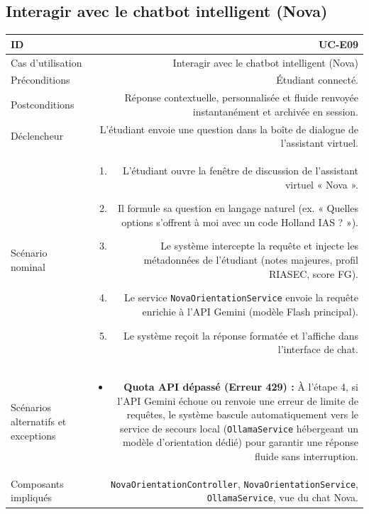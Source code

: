 \vspace{1.5em}

\subsection{Interagir avec le chatbot intelligent (Nova)}

\noindent
{}
\begin{tabularx}{\linewidth}{|L|R|}
\hline
{}ID & UC-E09 \\
\hline
Cas d'utilisation & Interagir avec le chatbot intelligent (Nova) \\
\hline
{}Préconditions & Étudiant connecté. \\
\hline
Postconditions & Réponse contextuelle, personnalisée et fluide renvoyée instantanément et archivée en session. \\
\hline
{}Déclencheur & L'étudiant envoie une question dans la boîte de dialogue de l'assistant virtuel. \\
\hline
Scénario nominal &
\begin{enumerate}[nosep,leftmargin=*]
  \item L'étudiant ouvre la fenêtre de discussion de l'assistant virtuel « Nova ».
  \item Il formule sa question en langage naturel (ex. « Quelles options s'offrent à moi avec un code Holland IAS ? »).
  \item Le système intercepte la requête et injecte les métadonnées de l'étudiant (notes majeures, profil RIASEC, score FG).
  \item Le service \texttt{NovaOrientationService} envoie la requête enrichie à l'API Gemini (modèle Flash principal).
  \item Le système reçoit la réponse formatée et l'affiche dans l'interface de chat.
\end{enumerate} \\
\hline
{}Scénarios alternatifs et exceptions &
\begin{itemize}[nosep,leftmargin=*]
  \item \textbf{Quota API dépassé (Erreur 429) :} À l'étape 4, si l'API Gemini échoue ou renvoie une erreur de limite de requêtes, le système bascule automatiquement vers le service de secours local (\texttt{OllamaService} hébergeant un modèle d'orientation dédié) pour garantir une réponse fluide sans interruption.
\end{itemize} \\
\hline
Composants impliqués & \texttt{NovaOrientationController}, \texttt{NovaOrientationService}, \texttt{OllamaService}, vue du chat Nova. \\
\hline
\end{tabularx}

